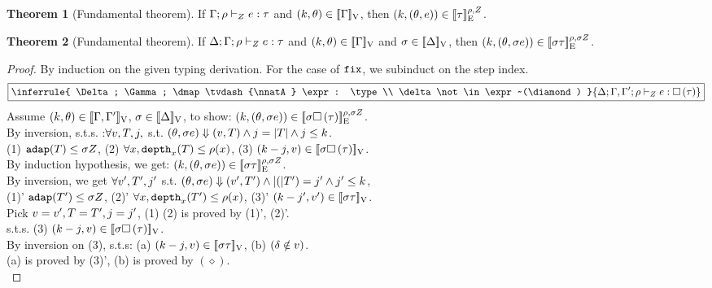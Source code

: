 \documentclass[a4paper,11pt]{article}
\theoremstyle{definition}
\newtheorem{thm}{Theorem}
\begin{document}
\begin{thm}[Fundamental theorem]
  If $\Gamma; \rho \vdash_{Z} e: \tau$ and $(k, \theta)
  \in [\![ \Gamma ]\!]_{\text{V}}$, then $(k, (\theta, e)) \in
  [\![ \tau ]\!]_{\text{E}}^{\rho, Z}$.
\end{thm}
{\color{red}
\begin{thm}[Fundamental theorem]
  If $\Delta; \Gamma; \rho \vdash_{Z} e: \tau$ and $(k, \theta)
  \in [\![ \Gamma ]\!]_{\text{V}}$ and $ \sigma \in [\![ \Delta ]\!]_{\text{V}}$, then $(k, (\theta, \sigma e)) \in
  [\![ \sigma \tau ]\!]_{\text{E}}^{\rho, \sigma Z}$.
\end{thm}%
}
\begin{proof}
By induction on the given typing derivation. For the case of
$\mathop{\mathtt{fix}}$, we subinduct on the step index.\\

\[
    \boxed{
     \inferrule{
      \Delta; \Gamma; \dmap \tvdash{\nnatA} \expr: \type \\
      \delta \not\in \expr~(\diamond)
    }{
      \Delta; \Gamma, \Gamma'; \dmap \tvdash{\nnatA} \expr: \tbox{\type}
    }    
    }
\]
Assume $(k, \theta) \in [\![ \Gamma, \Gamma' ]\!]_{\text{V}}$, $\sigma \in [\![ \Delta ]\!]_{\text{V}}$, to show: $(k, (\theta, \sigma e)) \in [\![ \sigma \mathtt{\square} \, (\tau) ]\!]_{\text{E}}^{\rho, \sigma Z}$.\\
%
By inversion, s.t.s. :$ \forall v, T, j, 
$ s.t. $ (\theta, \sigma e) \mathrel{\Downarrow} (v, T) \land j = |T| \land j \leq k $.  \\
(1) $\mathtt{adap}(T) \leq \sigma Z $, (2) $\forall x, \mathtt{depth}_{x}(T) \leq \rho(x)$, (3) $(k-j, v) \in [\![  \sigma \mathtt{\square} \, (\tau)  ]\!]_{\text{V}} $. \\
%
By induction hypothesis, we get: $(k, (\theta, \sigma e)) \in [\![ \sigma \tau ]\!]_{\text{E}}^{\rho, \sigma Z}$.\\
%
By inversion, we get $\forall v', T', j'$ s.t. $(\theta, \sigma e) \mathrel{\Downarrow} (v', T') \land |(|T') = j' \land j' \leq k$,\\
(1)' $\mathtt{adap}(T') \leq \sigma Z$, (2)' $\forall x, \mathtt{depth}_{x}(T') \leq \rho(x)$, (3)' $(k - j', v') \in [\![ \sigma \tau ]\!]_{\text{V}}$.\\
%
Pick $v = v', T = T' , j = j'$, (1) (2) is proved by (1)', (2)'.\\
%
s.t.s. (3) $(k - j, v ) \in [\![ \sigma \mathtt{\square} \, (\tau) ]\!]_{\text{V}}$.\\
%
By inversion on (3), s.t.s: (a) $(k - j, v) \in [\![ \sigma \tau ]\!]_{\text{V}}$, (b) $(\delta \notin v)$.\\
(a) is proved by (3)', (b) is proved by $(\diamond)$.
\\


\end{proof}
\end{document}
